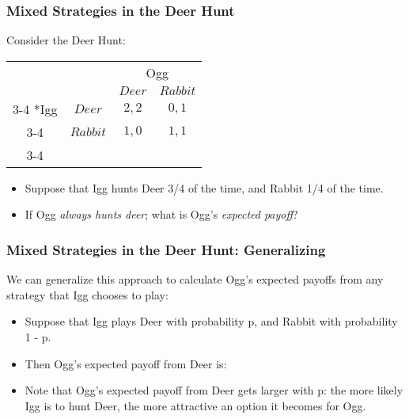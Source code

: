 \begin{frame}
\frametitle{Mixed Strategies in the Deer Hunt}

Consider the Deer Hunt:

\begin{table}[h]
\centering
\begin{tabular}{cc|c|c|}
	& \multicolumn{1}{c}{} & \multicolumn{2}{c}{Ogg}\\
	& \multicolumn{1}{c}{} & \multicolumn{1}{c}{$Deer$}  & \multicolumn{1}{c}{$Rabbit$} \\\cline{3-4}
	\multirow{2}*{Igg}  & $Deer$ & $2, 2$ & $0, 1$ \\\cline{3-4}
	& $Rabbit$ & $1, 0$ & $1, 1$ \\\cline{3-4}
\end{tabular}
\end{table}

\begin{itemize}
	\item Suppose that Igg hunts Deer 3/4 of the time, and Rabbit 1/4 of the time.

  \item If Ogg \textit{always hunts deer}; 
  what is Ogg's \textit{expected payoff}?

  \vspace{5mm}

\end{itemize}
\end{frame}

\begin{frame}
\frametitle{Mixed Strategies in the Deer Hunt: Generalizing}

We can generalize this approach to calculate Ogg's expected payoffs from any strategy that Igg chooses to play:

\begin{itemize}

	\item Suppose that Igg plays Deer with probability p, and Rabbit with probability 1 - p.

	\item Then Ogg's expected payoff from Deer is:
  \vspace{20mm}

	\item Note that Ogg's expected payoff from Deer gets larger with p: the more likely Igg is to hunt Deer, the more attractive an option it becomes for Ogg.

\end{itemize}
\end{frame}

